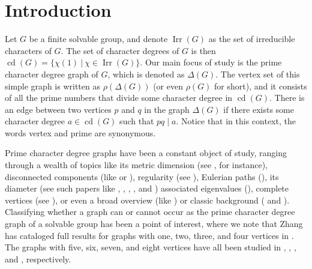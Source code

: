\documentclass[11pt]{amsart}
\theoremstyle{definition}
\theoremstyle{remark}
\DeclareMathOperator{\cd}{cd}
\DeclareMathOperator{\Irr}{Irr}
\numberwithin{equation}{section}
\begin{document}


\begin{abstract}
We conclude the classification work done in the two previous papers of the same name. Here we add flexibility to the construction, thereby viewing the graphs in full generality. Our goal, as ever, is to determine which graphs do or do not occur as the prime character degree graph of a solvable group.
\end{abstract}


\maketitle


\section{Introduction}


Let $G$ be a finite solvable group, and denote $\Irr(G)$ as the set of irreducible characters of $G$. The set of character degrees of $G$ is then $\cd(G)=\{\chi(1)~|~\chi\in\Irr(G)\}$. Our main focus of study is the prime character degree graph of $G$, which is denoted as $\Delta(G)$. The vertex set of this simple graph is written as $\rho(\Delta(G))$ (or even $\rho(G)$ for short), and it consists of all the prime numbers that divide some character degree in $\cd(G)$. There is an edge between two vertices $p$ and $q$ in the graph $\Delta(G)$ if there exists some character degree $a\in\cd(G)$ such that $pq\mid a$. Notice that in this context, the words vertex and prime are synonymous. 

Prime character degree graphs have been a constant object of study, ranging through a wealth of topics like its metric dimension (see \cite{CSSTL}, for instance), disconnected components (like \cite{L} or \cite{LS}), regularity (see \cite{M2}), Eulerian paths (\cite{SST}), its diameter (see such papers like \cite{CDPS}, \cite{DHS}, \cite{L2}, \cite{L2.5}, and \cite{S}) associated eigenvalues (\cite{SS}), complete vertices (see \cite{M}), or even a broad overview (like \cite{L4}) or classic background (\cite{H2} and \cite{I}). Classifying whether a graph can or cannot occur as the prime character degree graph of a solvable group has been a point of interest, where we note that Zhang has cataloged full results for graphs with one, two, three, and four vertices in \cite{Z}. The graphs with five, six, seven, and eight vertices have all been studied in \cite{L3}, \cite{BLL}, \cite{LMS}, and \cite{LS2}, respectively.
\end{document}
